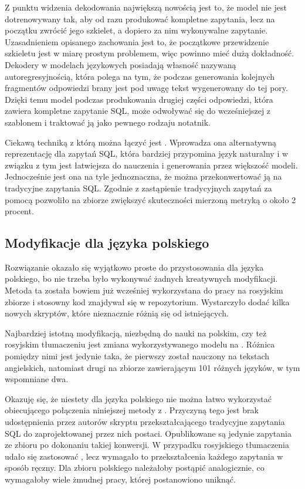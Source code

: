 Z punktu widzenia dekodowania największą nowością jest to, że model  nie jest dotrenowywany tak, aby od razu produkować kompletne zapytania, lecz na początku zwrócić jego szkielet, a dopiero za nim wykonywalne zapytanie. Uzasadnieniem opisanego zachowania jest to, że początkowe przewidzenie szkieletu jest w miarę prostym problemem, więc powinno mieć dużą dokładność. Dekodery w modelach językowych posiadają własność nazywaną autoregresyjnością, która polega na tym, że podczas generowania kolejnych fragmentów odpowiedzi brany jest pod uwagę tekst wygenerowany do tej pory. Dzięki temu model  podczas produkowania drugiej części odpowiedzi, która zawiera kompletne zapytanie SQL, może odwoływać się do wcześniejszej z szablonem i traktować ją jako pewnego rodzaju notatnik.

Ciekawą techniką z którą  można łączyć jest  . Wprowadza ona alternatywną reprezentację dla zapytań SQL, która bardziej przypomina język naturalny i w związku z tym jest łatwiejsza do nauczenia i generowania przez większość modeli. Jednocześnie jest ona na tyle jednoznaczna, że można przekonwertować ją na tradycyjne zapytania SQL. Zgodnie z  zastąpienie tradycyjnych zapytań za pomocą  pozwoliło na zbiorze  zwiększyć skuteczności mierzoną metryką  o około 2 procent.

\subsection{Modyfikacje dla języka polskiego}
Rozwiązanie  okazało się wyjątkowo proste do przystosowania dla języka polskiego, bo nie trzeba było wykonywać żadnych kreatywnych modyfikacji. Metoda ta została bowiem już wcześniej wykorzystana do pracy na rosyjskim zbiorze  i stosowny kod znajdywał się w repozytorium. Wystarczyło dodać kilka nowych skryptów, które nieznacznie różnią się od istniejących.

Najbardziej istotną modyfikacją, niezbędną do nauki na polskim, czy też rosyjskim tłumaczeniu jest zmiana wykorzystywanego modelu  na  . Różnica pomiędzy nimi jest jedynie taka, że pierwszy został nauczony na tekstach angielskich, natomiast drugi na zbiorze zawierającym 101 różnych języków, w tym wspomniane dwa.

Okazuję się, że niestety dla języka polskiego nie można łatwo wykorzystać obiecującego połączenia niniejszej metody z . Przyczyną tego jest brak udostępnienia przez autorów  skryptu przekształcającego tradycyjne zapytania SQL do zaprojektowanej przez nich postaci. Opublikowane są jedynie zapytania ze zbioru  po dokonaniu takiej konwersji. W przypadku rosyjskiego tłumaczenia udało się zastosować , lecz wymagało to przekształcenia każdego zapytania w sposób ręczny. Dla zbioru polskiego należałoby postąpić analogicznie, co wymagałoby wiele żmudnej pracy, której postanowiono uniknąć.

